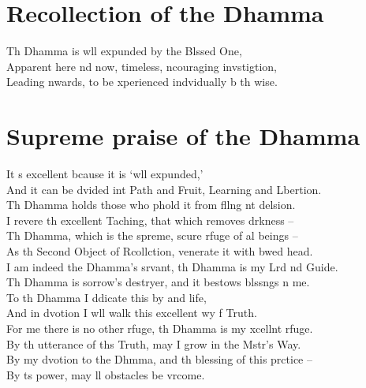 \clearpage

\chapter{Recollection of the Dhamma}%

\begin{leader}
\end{leader}

Th Dhamma is wll expunded by the Blssed One,\\
Apparent here nd now, timeless, ncouraging invstigtion,\\
Leading nwards, to be xperienced indvidually b th wise.

\chapter{Supreme praise of the Dhamma}%

\begin{leader}
\end{leader}

It s excellent bcause it is `wll expunded,'\\
And it can be dvided int Path and Fruit, Learning and Lbertion.\\
Th Dhamma holds those who phold it from fllng nt delsion.\\
I revere th excellent Taching, that which removes drkness --\\
Th Dhamma, which is the spreme, scure rfuge of al beings --\\
As th Second Object of Rcollction,  venerate it with bwed head.\\
I am indeed the Dhamma's srvant, th Dhamma is my Lrd nd Guide.\\
Th Dhamma is sorrow's destryer, and it bestows blssngs n me.\\
To th Dhamma I ddicate this by and life,\\
And in dvotion I wll walk this excellent wy f Truth.\\
For me there is no other rfuge, th Dhamma is my xcellnt rfuge.\\
By th utterance of ths Truth, may I grow in the Mstr's Way.\\
By my dvotion to the Dhmma, and th blessing of this prctice --\\
By ts power, may ll obstacles be vrcome.

